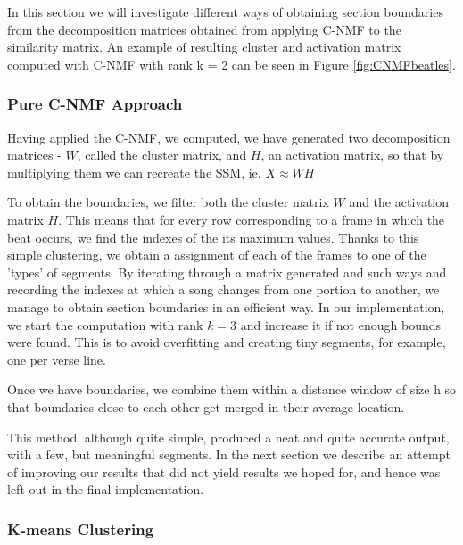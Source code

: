 In this section we will investigate different ways of obtaining section boundaries from the decomposition matrices obtained from applying C-NMF to the similarity matrix. An example of resulting cluster and activation matrix computed with C-NMF with rank k = 2 can be seen in Figure \ref{fig:CNMFbeatles}.

\subsubsection*{Pure C-NMF Approach}
\label{sec:finalBounds}
Having applied the C-NMF, we computed, we have generated two decomposition matrices - $W$, called the cluster matrix, and $H$, an activation matrix, so that by multiplying them we can recreate the SSM, ie. $X \approx  WH$       
        
To obtain the boundaries, we filter both the cluster matrix $W$ and the activation matrix $H$. This means that for every row corresponding to a frame in which the beat occurs, we find the indexes of the its maximum values. Thanks to this simple clustering, we obtain a assignment of each of the frames to one of the 'types' of segments. By iterating through a matrix generated and such ways and recording the indexes at which a song changes from one portion to another, we manage to obtain section boundaries in an efficient way. In our implementation, we start the computation with rank $k = 3$ and increase it if not enough bounds were found. This is to avoid overfitting and creating tiny segments, for example, one per verse line.

Once we have boundaries, we combine them within a distance window of size h so that boundaries close to each other get merged in their average location.

This method, although quite simple, produced a neat and quite accurate output, with a few, but meaningful segments. In the next section we describe an attempt of improving our results that did not yield results we hoped for, and hence was left out in the final implementation.

\subsubsection*{K-means Clustering}
\label{sec:kmeans}


